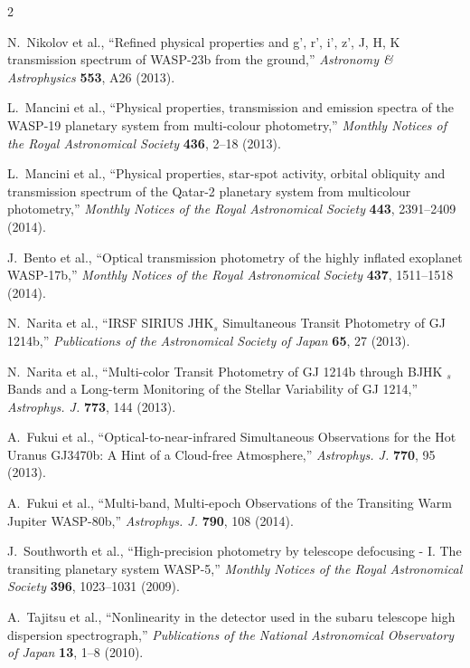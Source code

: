 \documentclass[a4paper,12pt]{spieman}  %
\begin{document}
\begin{spacing}{2}
\begin{thebibliography}{}
N.~{Nikolov} et al., ``{Refined physical properties and g', r',
  i', z', J, H, K transmission spectrum of WASP-23b from the ground},'' {\em
  Astronomy \& Astrophysics} {\bf 553}, A26  (2013).

L.~{Mancini} et al., ``{Physical properties,
  transmission and emission spectra of the WASP-19 planetary system from
  multi-colour photometry},'' {\em Monthly Notices of the Royal Astronomical Society} {\bf 436}, 2--18  (2013).

L.~{Mancini} et al., ``{Physical properties, star-spot activity, orbital obliquity and
  transmission spectrum of the Qatar-2 planetary system from multicolour
  photometry},'' {\em Monthly Notices of the Royal Astronomical Society} {\bf 443}, 2391--2409  (2014).

J.~{Bento} et al., ``{Optical transmission photometry of the highly
  inflated exoplanet WASP-17b},'' {\em Monthly Notices of the Royal Astronomical Society} {\bf 437}, 1511--1518  (2014).

N.~{Narita} et al., ``{IRSF SIRIUS JHK$_{s}$
  Simultaneous Transit Photometry of GJ 1214b},'' {\em Publications of the Astronomical Society of Japan} {\bf 65}, 27
  (2013).

N.~{Narita} et al., ``{Multi-color Transit Photometry of GJ 1214b through BJHK
  $_{s}$ Bands and a Long-term Monitoring of the Stellar Variability of GJ
  1214},'' {\em Astrophys. J.} {\bf 773}, 144  (2013).

A.~{Fukui} et al., ``{Optical-to-near-infrared
  Simultaneous Observations for the Hot Uranus GJ3470b: A Hint of a Cloud-free
  Atmosphere},'' {\em Astrophys. J.} {\bf 770}, 95  (2013).

A.~{Fukui} et al., ``{Multi-band, Multi-epoch
  Observations of the Transiting Warm Jupiter WASP-80b},'' {\em Astrophys. J.} {\bf
  790}, 108  (2014).

J.~{Southworth} et al., ``{High-precision photometry by telescope defocusing - I. The transiting
  planetary system WASP-5},'' {\em Monthly Notices of the Royal Astronomical Society} {\bf 396}, 1023--1031  (2009).

A.~{Tajitsu} et al., ``Nonlinearity in
  the detector used in the subaru telescope high dispersion spectrograph,''
  {\em Publications of the National Astronomical Observatory of Japan} {\bf
  13}, 1--8  (2010).


\end{thebibliography}
\end{spacing}
\end{document}
